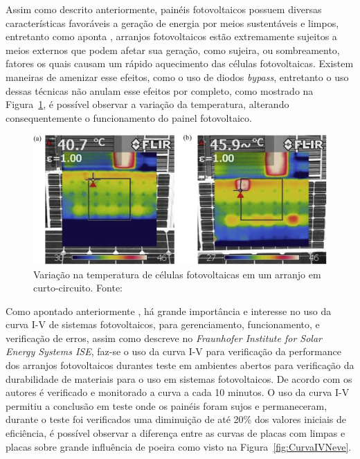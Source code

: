 Assim como descrito anteriormente, painéis fotovoltaicos possuem diversas características favoráveis a geração de energia por meios sustentáveis e limpos, entretanto como aponta , arranjos fotovoltaicos estão extremamente sujeitos a meios externos que podem afetar sua geração, como sujeira, ou sombreamento, fatores os quais causam um rápido aquecimento das células fotovoltaicas. Existem maneiras de amenizar esse efeitos, como o uso de diodos \textit{bypass}, entretanto o uso dessas técnicas não anulam esse efeitos por completo, como mostrado na Figura~\ref{fig:Temp}, é possível observar a variação da temperatura, alterando consequentemente o funcionamento do painel fotovoltaico.

\FloatBarrier
\begin{figure}[htbp]
	\centering
	\includegraphics[scale=1.3]{imagens/Temp_BRESSAN}
	\caption{Variação na temperatura de células fotovoltaicas em um arranjo em curto-circuito. Fonte:   }
	
	\label{fig:Temp}
\end{figure}
\FloatBarrier

Como apontado anteriormente , há grande importância e interesse no uso da curva I-V de sistemas fotovoltaicos, para gerenciamento, funcionamento, e verificação de erros, assim como descreve  no \textit{Fraunhofer Institute for Solar Energy Systems ISE}, faz-se o uso da curva I-V para verificação da performance dos arranjos fotovoltaicos durantes teste em ambientes abertos para verificação da durabilidade de materiais para o uso em sistemas fotovoltaicos. De acordo com os autores é verificado e monitorado a curva a cada 10 minutos. O uso da curva I-V permitiu a conclusão em teste onde os painéis foram sujos e permaneceram, durante o teste foi verificados uma diminuição de até 20\% dos valores iniciais de eficiência, é possível observar a diferença entre as curvas de placas com limpas e placas sobre grande influência de poeira como visto na Figura~\ref{fig:CurvaIVNeve}.

